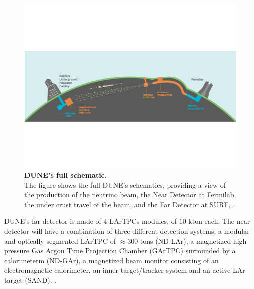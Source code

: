 \begin{figure}[h!]
	\begin{center}
		\includegraphics[scale=0.6]{Figures/DUNE_full_schematic.pdf}
		\caption[DUNE's full schematic]{ {\textbf{DUNE's full schematic.}} \\The figure shows the full DUNE's schematics, providing a view of the production of the neutrino beam, the Near Detector at Fermilab, the under crust travel of the beam, and the Far Detector at SURF, \cite{dune_snowmass_22}.}
		\label{DUNE_full_schematic}	
	\end{center}
\end{figure}

DUNE's far detector is made of $4$ LArTPCs modules, of $10$ kton each. The near detector will have a combination of three different detection systems: a modular and optically segmented LArTPC of $\approx300$ tons (ND-LAr), a magnetized high-pressure Gas Argon Time Projection Chamber (GArTPC) surrounded by a calorimeterm (ND-GAr), a magnetized beam monitor consisting of an electromagnetic calorimeter, an inner target/tracker system and an active LAr target (SAND). \cite{dune_snowmass_22, dune_SAND}.